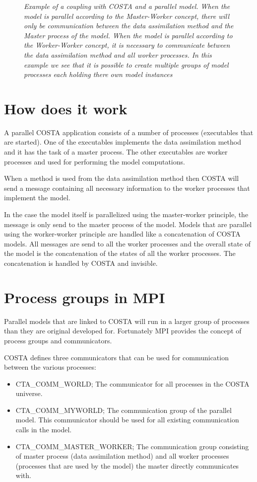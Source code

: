 \documentclass[a4paper,12pt]{article}
\newcommand{\figs}{figs}
\begin{document}
\begin{figure}
\epsfig{figure=\figs/WW_processes.\pdfeps}
\caption{\em Example of a coupling with COSTA and a parallel model. When the
model is parallel according to the Master-Worker concept, there will only
be communication between the data assimilation method and the Master process
of the model. When the model is parallel according to the Worker-Worker
concept, it is necessary to communicate between the data assimilation
method and all worker processes. In this example we see that it is possible
to create multiple groups of model processes each holding there own model
instances}
\label{Fig:WW_processes}
\end{figure}


\section{How does it work}
A parallel COSTA application consists of a number of processes (executables
that are started). One of the executables implements the data assimilation
method and it has the task of a master process. The other executables are
worker processes and used for performing the model computations. 

When a method is used from the data assimilation method then COSTA
will send a message containing all necessary information to the worker
processes that implement the model. 

In the case the model itself is parallelized using the master-worker
principle, the message is only send to the master process of the model. 
Models that are parallel using the worker-worker principle are handled like
a concatenation of COSTA models. All messages are send to all the worker
processes and the overall state of the model is the concatenation of the
states of all the worker processes. The concatenation is handled by COSTA
and invisible.

\section{Process groups in MPI}
Parallel models that are linked to COSTA will run in a larger group of
processes than they are original developed for. Fortunately MPI
provides the concept of process groups and communicators.

COSTA defines three communicators that can be used for communication
between the various processes:
\begin{itemize}
\item CTA\_COMM\_WORLD; The communicator for all processes in the
      COSTA universe.
\item CTA\_COMM\_MYWORLD; The communication group of the parallel model.
      This communicator should be used for all existing communication calls in
      the model.
\item CTA\_COMM\_MASTER\_WORKER; The communication group consisting of
      master process (data assimilation method) and all worker processes
      (processes that are used by the model) the master directly
      communicates with.
\end{itemize}
\end{document}
